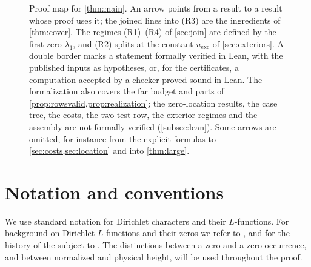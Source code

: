 \documentclass[11pt]{amsart}
\numberwithin{equation}{section}
\theoremstyle{plain}
\theoremstyle{definition}
\theoremstyle{remark}
\newcommand{\1}{\mathbf{1}}
\begin{document}
\begin{figure}[tbp]
\caption{Proof map for \cref{thm:main}. An arrow points from a result to a result whose
proof uses it; the joined lines into (R3) are the ingredients of \cref{thm:cover}. The
regimes (R1)--(R4) of \cref{sec:join} are defined by the first zero $\lambda_1$, and (R2)
splits at the constant $u_{\mathrm{exc}}$ of \cref{sec:exteriors}. A double border marks a
statement formally verified in Lean, with the published inputs as hypotheses, or, for the
certificates, a computation accepted by a checker proved sound in Lean. The formalization
also covers the far budget and parts of \cref{prop:rowsvalid,prop:realization}; the
zero-location results, the case tree, the costs, the two-test row, the exterior regimes and
the assembly are not formally verified (\cref{subsec:lean}). Some arrows are omitted, for
instance from the explicit formulas to \cref{sec:costs,sec:location} and into
\cref{thm:large}.}
\label{fig:proofmap}
\end{figure}


\section{Notation and conventions}\label{sec:notation}

We use standard notation for Dirichlet characters and their $L$-functions. For background on
Dirichlet $L$-functions and their zeros we refer to
\cite{Ingham1932distribution,Titchmarsh1986theory,Karatsuba1993basic,Montgomery1994ten,
Davenport2000multiplicative,IwaniecKowalski2004analytic,MontgomeryVaughan2007multiplicative,
Tenenbaum2015introduction}, and for the history of the subject to \cite{Narkiewicz2000development}. The distinctions between a zero and a zero occurrence, and between
normalized and physical height, will be used throughout the proof.
\end{document}
